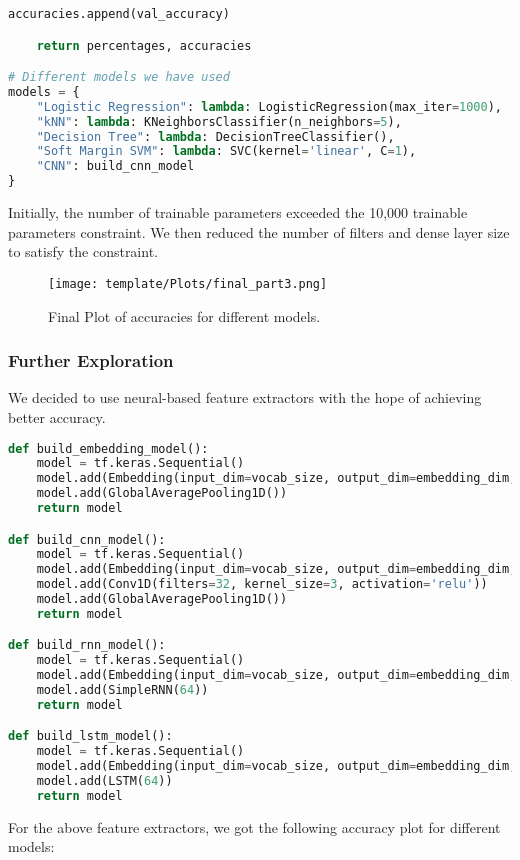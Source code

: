 \documentclass{article} %
\begin{document}
\begin{lstlisting}[language=Python]
        accuracies.append(val_accuracy)

    return percentages, accuracies

# Different models we have used
models = {
    "Logistic Regression": lambda: LogisticRegression(max_iter=1000),
    "kNN": lambda: KNeighborsClassifier(n_neighbors=5),
    "Decision Tree": lambda: DecisionTreeClassifier(),
    "Soft Margin SVM": lambda: SVC(kernel='linear', C=1),
    "CNN": build_cnn_model
}
\end{lstlisting}
Initially, the number of trainable parameters exceeded the 10,000 trainable parameters constraint. We then reduced the number of filters and dense layer size to satisfy the constraint.
\begin{figure}
    \centering
    \texttt{[image: template/Plots/final\_part3.png]}
    \caption{Final Plot of accuracies for different models.}
    \label{fig:9}
\end{figure}

\subsubsection{Further Exploration}
We decided to use neural-based feature extractors with the hope of achieving better accuracy. 
\begin{lstlisting}[language=Python]
def build_embedding_model():
    model = tf.keras.Sequential()
    model.add(Embedding(input_dim=vocab_size, output_dim=embedding_dim, input_length=max_length))
    model.add(GlobalAveragePooling1D())
    return model

def build_cnn_model():
    model = tf.keras.Sequential()
    model.add(Embedding(input_dim=vocab_size, output_dim=embedding_dim, input_length=max_length))
    model.add(Conv1D(filters=32, kernel_size=3, activation='relu'))
    model.add(GlobalAveragePooling1D())
    return model

def build_rnn_model():
    model = tf.keras.Sequential()
    model.add(Embedding(input_dim=vocab_size, output_dim=embedding_dim, input_length=max_length))
    model.add(SimpleRNN(64))
    return model

def build_lstm_model():
    model = tf.keras.Sequential()
    model.add(Embedding(input_dim=vocab_size, output_dim=embedding_dim, input_length=max_length))
    model.add(LSTM(64))
    return model
\end{lstlisting}
For the above feature extractors, we got the following accuracy plot for different models:
\end{document}
